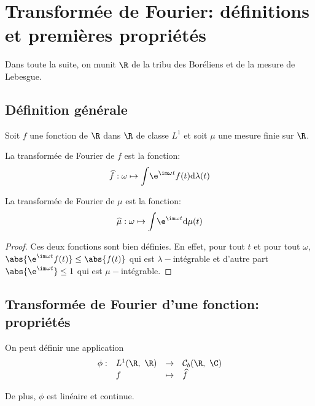 \section{Transformée de Fourier: définitions et premières propriétés}

Dans toute la suite, on munit $\R$ de la tribu des Boréliens et de la mesure de Lebesgue.

\subsection{Définition générale}

\begin{de}
Soit $f$ une fonction de $\R$ dans $\R$ de classe $L^1$ et soit $\mu$ une mesure finie sur $\R$. 

La transformée de Fourier de $f$ est la fonction:
\[\widehat{f}: \omega \mapsto \displaystyle{\int} \e^{\im \omega t} f(t) \mathrm d \lambda(t)\]

La transformée de Fourier de $\mu$ est la fonction:
\[\widehat{\mu}: \omega \mapsto \displaystyle{\int} \e^{\im \omega t}  \mathrm d \mu(t)\]
\end{de}

\begin{proof}
Ces deux fonctions sont bien définies. En effet, pour tout $t$ et pour tout $\omega$, 
$\abs{\e^{\im \omega t} f(t)} \leq \abs{f(t)}$ qui est $\lambda-$intégrable et d'autre part $\abs{\e^{\im \omega t}} \leq 1$ qui est $\mu-$intégrable.
\end{proof}

\subsection{Transformée de Fourier d'une fonction: propriétés}

\begin{prop}
On peut définir une application 
\[
\begin{array}{llcl}
\phi: & L^1(\R,~\R) & \to & \mathcal{C}_b(\R,~\C) \\
 & f & \mapsto & \widehat{f}
\end{array}
\]

De plus, $\phi$ est linéaire et continue.
\end{prop}



